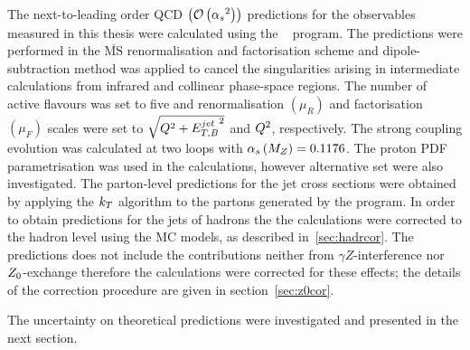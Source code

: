 The next-to-leading order QCD $ \left( \mathcal{O}\left( \mbox{$\alpha_{s}$}^2\right) \right) $ predictions for the observables measured in this thesis were calculated using the \nlojet~\cite{nlojet++} program. The predictions were performed in the $\overline{\text{MS}}$ renormalisation and factorisation scheme and dipole-subtraction method was applied to cancel the singularities arising in intermediate calculations from infrared and collinear phase-space regions. The number of active flavours was set to five and renormalisation $\left( \mu_R \right) $ and factorisation $\left( \mu_F \right) $ scales were set to $\sqrt{Q^2+\mbox{$E_{T,B}^{jet}$}^2}$ and $\mbox{${Q^2}$}$, respectively. The strong coupling evolution was calculated at two loops with $\mbox{$\alpha_{s}\left(M_{Z}\right)$}=0.1176$. The  proton PDF parametrisation was used in the calculations, however alternative set were also investigated. The parton-level predictions for the jet cross sections were obtained by applying the $\mbox{$k_{T}$}$ algorithm to the partons generated by the program. In order to obtain predictions for the jets of hadrons the the calculations were corrected to the hadron level using the MC models, as described in~\ref{sec:hadrcor}. The predictions does not include the contributions neither from $\gamma Z$-interference nor $\mbox{$Z_0$}$-exchange therefore the calculations were corrected for these effects; the details of the correction procedure are given in section~\ref{sec:z0cor}. 

The uncertainty on theoretical predictions were investigated and presented in the next section.